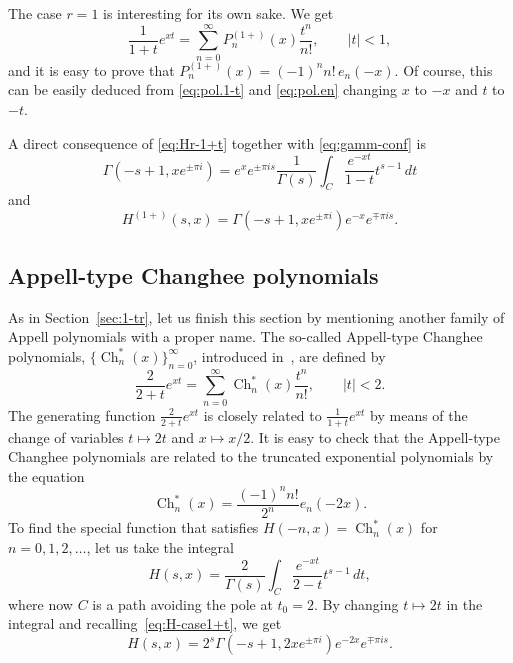 \documentclass[11pt,a4paper]{amsart}
\newcommand{\Ch}{\operatorname{Ch}}
\theoremstyle{plain}
\theoremstyle{plain}
\theoremstyle{remark}
\numberwithin{equation}{section}
\begin{document}
The case $r=1$ is interesting for its own sake. We get
\begin{equation}
\label{eq:pol.1+t}
  \frac{1}{1+t} e^{xt} = \sum_{n=0}^{\infty} P_n^{(1+)}(x) \frac{t^n}{n!},
  \qquad |t| < 1,
\end{equation}
and it is easy to prove that $P_n^{(1+)}(x) = (-1)^n n!\, e_n(-x)$. Of course, this can be easily deduced from \eqref{eq:pol.1-t} and \eqref{eq:pol.en} changing $x$ to $-x$ and $t$ to~$-t$.

A direct consequence of \eqref{eq:Hr-1+t} together with \eqref{eq:gamm-conf} is
\begin{equation*}
  \Gamma(-s+1,xe^{\pm\pi i}) = e^xe^{\pm\pi i s} \frac{1}{\Gamma(s)} 
  \int_{C} \frac{e^{-xt}}{1-t} t^{s-1}\, dt 
\end{equation*}
and
\begin{equation}
\label{eq:H-case1+t}
  H^{(1+)}(s,x) 
  = \Gamma(-s+1,xe^{\pm \pi i}) e^{-x}e^{\mp \pi i s}.
\end{equation}

\subsection{Appell-type Changhee polynomials}

As in Section~\ref{sec:1-tr}, let us finish this section by mentioning another family of Appell polynomials with a proper name. The so-called Appell-type Changhee polynomials, $\{\Ch_n^*(x)\}_{n=0}^{\infty}$, introduced in~\cite{LJSCK}, are defined by
\begin{equation*}
  \frac{2}{2+t}e^{xt} = \sum_{n=0}^{\infty} \Ch_n^{*}(x) \frac{t^n}{n!},
  \qquad |t| < 2.
\end{equation*}
The generating function $\frac{2}{2+t}e^{xt}$ is closely related to $\frac{1}{1+t}e^{xt}$ by means of the change of variables $t \mapsto 2t$ and $x \mapsto x/2$. It is easy to check that the  Appell-type Changhee polynomials are related to the truncated exponential polynomials by the equation
\begin{equation*}
  \Ch_n^{*}(x) = \frac{(-1)^n n!}{2^n}e_n(-2x).
\end{equation*}
To find the special function that satisfies $H(-n,x) = \Ch_n^*(x)$ for $n=0,1,2,\dots$, let us take the integral
\begin{equation*}
  H(s,x) = \frac{2}{\Gamma(s)}\int_{C} \frac{e^{-xt}}{2-t}t^{s-1}\,dt,
\end{equation*}
where now $C$ is a path avoiding the pole at $t_0=2$. By changing $t \mapsto 2t$ in the integral and recalling~\eqref{eq:H-case1+t}, we get
\begin{equation*}
  H(s,x) = 2^{s} \Gamma(-s+1,2xe^{\pm \pi i})e^{-2x}e^{\mp \pi i s}.
\end{equation*}
\end{document}
